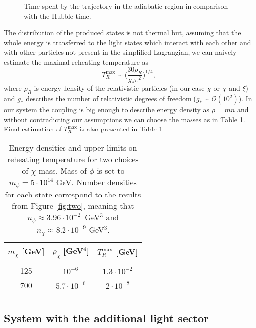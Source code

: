 \documentclass[twocolumn,showpacs,preprintnumbers,amsmath,amssymb,nofootinbib,superscriptaddress,prc]{revtex4}
\begin{document}
\begin{figure}[h!]
\begin{center}
\caption{ Time spent by the trajectory in the adiabatic region in comparison with the Hubble time.}
\label{fig:gravity}
\end{center}
\end{figure}

The distribution of the produced states is not thermal but, assuming that the whole energy is transferred to the light states which interact with each other and with other particles not present in the simplified Lagrangian, we can naively estimate the maximal reheating temperature as
 \begin{equation}
T_{R}^{\text{max}} \sim \Big( \frac{30 \rho_R}{g_* \pi^2} \Big)^{1/4},
 \end{equation}
 where $\rho_R$ is energy density of the relativistic particles (in our case $\chi$ or $\chi$ and $\xi$) and $g_*$ describes the number of relativistic degrees of freedom ($g_* \sim \mathcal{O}(10^2)$). In our system the coupling is big enough to describe energy density as $\rho = m n$ and without contradicting our assumptions we can choose the masses as in Table \ref{tab:1}. Final estimation of $T_{R}^{\text{max}}$ is also presented in Table \ref{tab:1}.

\begin{table}[t]
\caption{Energy densities and upper limits on reheating temperature for two choices of $\chi$ mass. Mass of $\phi$ is set to \mbox{$m_{\phi} = 5 \cdot 10^{14} \text{ GeV}$}. Number densities for each state correspond to the results from Figure \ref{fig:two}, meaning that \mbox{$n_{\phi} \approx 3.96 \cdot 10^{-2}$ GeV$^3$} and $n_{\chi} \approx 8.2 \cdot 10^{-9}$ GeV$^3$.}
\label{tab:1}
\begin{tabular}{ccc}
\hline  \hline
    $m_{\chi}$ [GeV] & $\rho_{\chi}$ [GeV$^4$] & $T_R^{\text{max}}$ [GeV] \\
  \hline  
   &  &   \\
    125 & $ 10^{-6}$ & $1.3 \cdot 10^{-2}$ \\
  700 & $5.7 \cdot 10^{-6}$ & $2 \cdot 10^{-2}$ \\
   &  &  \\
  \hline  \hline
  \end{tabular}
\end{table}


\subsection{System with the additional light sector}
\end{document}
